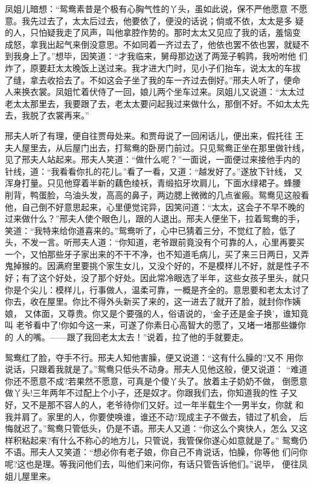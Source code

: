 凤姐儿暗想：“鸳鸯素昔是个极有心胸气性的丫头，虽如此说，保不严他愿意
不愿意。我先过去了，太太后过去，他要依了，便没的话说；倘或不依，太太是多
疑的人，只怕疑我走了风声，叫他拿腔作势的。那时太太又见应了我的话，羞恼变
成怒，拿我出起气来倒没意思。不如同着一齐过去了，他依也罢不依也罢，就疑不
到我身上了。”想毕，因笑道：“才我临来，舅母那边送了两笼子鹌鹑，我吩咐他
们炸了，原要赶太太晚饭上送过来。我才进大门时，见小子们抬车，说太太的车拔
了缝，拿去收拾去了。不如这会子坐了我的车一齐过去倒好。”邢夫人听了，便命
人来换衣裳。凤姐忙着伏侍了一回，娘儿两个坐车过来。凤姐儿又说道：“太太过
老太太那里去，我要跟了去，老太太要问起我过来做什么，那倒不好。不如太太先
去，我脱了衣裳再来。”

邢夫人听了有理，便自往贾母处来。和贾母说了一回闲话儿，便出来，假托往
王夫人屋里去，从后屋门出去，打鸳鸯的卧房门前过。只见鸳鸯正坐在那里做针线，
见了邢夫人站起来。邢夫人笑道：“做什么呢？”一面说，一面便过来接他手内的
针线，道：“我看看你扎的花儿。”看了一看，又道：“越发好了。”遂放下针线，
又浑身打量。只见他穿着半新的藕色绫袄，青缎掐牙坎肩儿，下面水绿裙子。蜂腰
削背，鸭蛋脸，乌油头发，高高的鼻子，两边腮上微微的几点雀瘢。鸳鸯见这般看
他，自己倒不好意思起来，心里便觉诧异，因笑问道：“太太，这会子不早不晚的
过来做什么？”邢夫人使个眼色儿，跟的人退出。邢夫人便坐下，拉着鸳鸯的手，
笑道：“我特来给你道喜来的。”鸳鸯听了，心中已猜着三分，不觉红了脸，低了
头，不发一言。听邢夫人道：“你知道，老爷跟前竟没有个可靠的人，心里再要买
一个，又怕那些牙子家出来的不干不净，也不知道毛病儿，买了来三日两日，又弄
鬼掉猴的。因满府里要挑个家生女儿，又没个好的，不是模样儿不好，就是性子不
好；有了这个好处，没了那个好处。因此常冷眼选了半年，这些女孩子里头，就只
你是个尖儿：模样儿，行事做人，温柔可靠，一概是齐全的。意思要和老太太讨了
你去，收在屋里。你比不得外头新买了来的，这一进去了就开了脸，就封你作姨娘，
又体面，又尊贵。你又是个要强的人，俗语说的，‘金子还是金子换’，谁知竟叫
老爷看中了!你如今这一来，可遂了你素日心高智大的愿了，又堵一堵那些嫌你的
人的嘴。——跟了我回老太太去！”说着，拉了他的手就要走。

鸳鸯红了脸，夺手不行。邢夫人知他害臊，便又说道：“这有什么臊的?又不
用你说话，只跟着我就是了。”鸳鸯只低头不动身。邢夫人见他这般，便又说道：
“难道你还不愿意不成?若果然不愿意，可真是个傻丫头了。放着主子奶奶不做，
倒愿意做丫头!三年两年不过配上个小子，还是奴才。你跟我们去，你知道我的性
子又好，又不是那不容人的人，老爷待你们又好。过一年半载生个一男半女，你就
和我并肩了。家里的人，你要使唤谁，谁还不动?现成主子不做去，错过了机会，
后悔就迟了。”鸳鸯只管低头，仍是不语。邢夫人又道：“你这么个爽快人，怎么
又这样积粘起来?有什么不称心的地方儿，只管说，我管保你遂心如意就是了。”
鸳鸯仍不语。邢夫人又笑道：“想必你有老子娘，你自己不肯说话，怕臊，你等他
们问你呢?这也是理。等我问他们去，叫他们来问你，有话只管告诉他们。”说毕，
便往凤姐儿屋里来。

